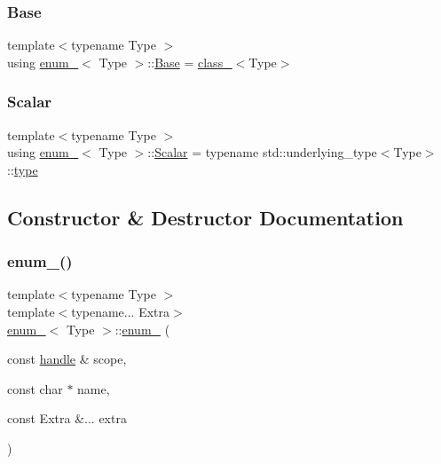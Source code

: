 \subsubsection{\texorpdfstring{Base}{Base}}
{\footnotesize\ttfamily template$<$typename Type $>$ \\
using \mbox{\hyperlink{classenum__}{enum\+\_\+}}$<$ Type $>$\+::\mbox{\hyperlink{classenum___a267908cc80a1ac648484ff98c8a49648}{Base}} =  \mbox{\hyperlink{classclass__}{class\+\_\+}}$<$Type$>$}

\mbox{\label{classenum___a1825e262342ffd5e7ea411185c9d5bd7}} 
\subsubsection{\texorpdfstring{Scalar}{Scalar}}
{\footnotesize\ttfamily template$<$typename Type $>$ \\
using \mbox{\hyperlink{classenum__}{enum\+\_\+}}$<$ Type $>$\+::\mbox{\hyperlink{classenum___a1825e262342ffd5e7ea411185c9d5bd7}{Scalar}} =  typename std\+::underlying\+\_\+type$<$Type$>$\+::\mbox{\hyperlink{classclass___a90e08a4ecffb596c1f1055f47747ad91}{type}}}



\subsection{Constructor \& Destructor Documentation}
\mbox{\label{classenum___a91101e5ded2dc0b8ef0405a7197f1cf1}} 
\subsubsection{\texorpdfstring{enum\_()}{enum\_()}}
{\footnotesize\ttfamily template$<$typename Type $>$ \\
template$<$typename... Extra$>$ \\
\mbox{\hyperlink{classenum__}{enum\+\_\+}}$<$ Type $>$\+::\mbox{\hyperlink{classenum__}{enum\+\_\+}} (\begin{DoxyParamCaption}\item[{const \mbox{\hyperlink{classhandle}{handle}} \&}]{scope,  }\item[{const char $\ast$}]{name,  }\item[{const Extra \&...}]{extra }\end{DoxyParamCaption})\hspace{0.3cm}{\ttfamily [inline]}}



